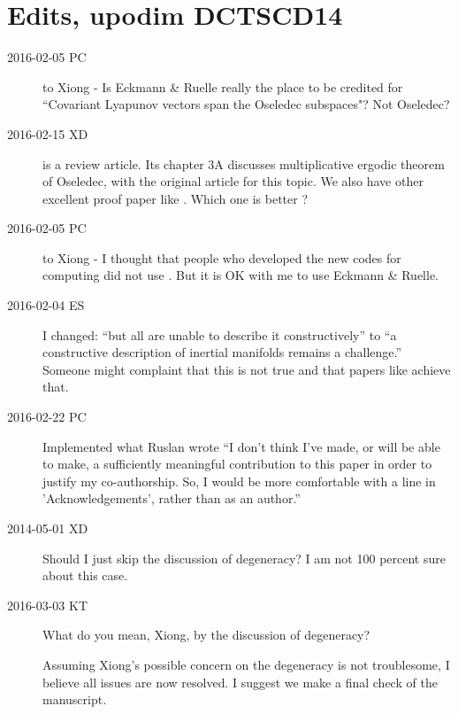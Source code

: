 
\section{Edits, upodim DCTSCD14}

\begin{description}

\item[2016-02-05 PC] to Xiong - Is Eckmann \&
    Ruelle really the place to be credited for
    ``Covariant Lyapunov vectors span the Oseledec subspaces"? Not
    Oseledec?

\item[2016-02-15 XD]  is a review article.
    Its chapter 3A discusses multiplicative ergodic theorem of
     Oseledec, with  the original article for this
     topic. We also have other excellent proof paper like
     . Which one is better ?

\item[2016-02-05 PC] to Xiong - I thought that people who developed the
new codes for computing \cLvs{} did not use
. But it is OK with me to use Eckmann
\& Ruelle.

\item[2016-02-04 ES] I changed: ``but all are unable to describe it
    constructively'' to ``a constructive description of inertial
    manifolds remains a challenge.'' Someone might complaint that this
    is not true and that papers like  achieve that.

\item[2016-02-22 PC] Implemented what Ruslan wrote ``I don't think I've
made, or will be able to make, a sufficiently meaningful contribution to
this paper in order to justify my co-authorship.  So, I would be more
comfortable with a line in 'Acknowledgements', rather than as an
author.''

\item[2014-05-01 XD]
Should I just skip the discussion of degeneracy? I am not 100
percent sure about this case.

\item[2016-03-03 KT] What do you mean, Xiong, by the discussion of degeneracy?

Assuming Xiong's possible concern on the degeneracy is not troublesome, I
believe all issues are now resolved. I suggest we make a final check of
the manuscript.


\end{description}
